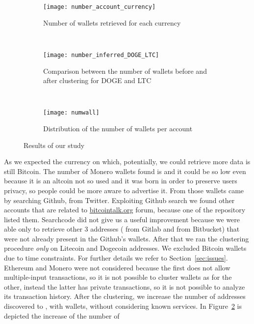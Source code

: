 \begin{figure*}
\centering
\begin{subfigure}[t]{0.3\textwidth}
\centering
\texttt{[image: number\_account\_currency]}
\caption{Number of wallets retrieved for each currency}
\label{fig:numberaccountcurrency}
\end{subfigure}
~
\begin{subfigure}[t]{0.3\textwidth}
\texttt{[image: number\_inferred\_DOGE\_LTC]}
\caption{Comparison between the number of wallets before and after clustering
for DOGE and LTC}
\label{fig:dogeltcclustered}
\end{subfigure}
~
\begin{subfigure}[t]{0.3\textwidth}
\centering
\texttt{[image: numwall]}
\caption{Distribution of the number of wallets per account}
\label{fig:numwall}
\end{subfigure}
\caption{Results of our study}
\end{figure*}
As we expected the currency on which, potentially, we could retrieve more data
is still Bitcoin. The number of Monero wallets found is \startingXMR{} and it
could be so low even because it is an altcoin not so used and it was born in
order to preserve users privacy, so people could be more aware to advertise it.
From those wallets \accountGithub{} came by searching Github, \accountTwitter{}
from Twitter. Exploiting Github search we found other \accountBitcointalk{}
accounts that are related to \url{bitcointalk.org} forum, because one of the
repository listed them. Searchcode did not give us a useful improvement
because we were able only to retrieve other 3 addresses (\accountGitlab{} from
Gitlab and \accountBitbucket{} from Bitbucket) that were not already present in
the Github's wallets.
After that we ran the clustering procedure \emph{only} on Litecoin and Dogecoin
addresses. We excluded Bitcoin wallets due to time constraints.
For further details we
refer to Section~\ref{sec:issues}. Ethereum and Monero were not considered
because the first does not allow multiple-input transactions, so it is not
possible to cluster wallets as for the other, instead the latter has private
transactions, so it is not possible to analyze its transaction history. 
After the clustering, we increase the number of addresses discovered to
\clusteringNumberAllWallets{}, with \clusteringNumberWalletsNotService{}
wallets, without considering known services.
In Figure~\ref{fig:dogeltcclustered} is depicted the increase of the number of
